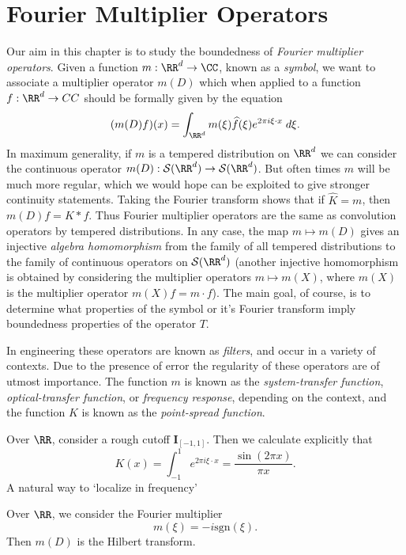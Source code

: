 \chapter{Fourier Multiplier Operators}

Our aim in this chapter is to study the boundedness of \emph{Fourier multiplier operators}. Given a function $m: \RR^d \to \CC$, known as a \emph{symbol}, we want to associate a multiplier operator $m(D)$ which when applied to a function $f: \RR^d \to CC$ should be formally given by the equation
%
\[ (m(D)f)(x) = \int_{\RR^d} m(\xi) \widehat{f}(\xi) e^{2 \pi i \xi \cdot x}\; d\xi. \]
%
In maximum generality, if $m$ is a tempered distribution on $\RR^d$ we can consider the continuous operator $m(D): \mathcal{S}(\RR^d) \to \mathcal{S}(\RR^d)$. But often times $m$ will be much more regular, which we would hope can be exploited to give stronger continuity statements. Taking the Fourier transform shows that if $\widehat{K} = m$, then $m(D) f = K * f$. Thus Fourier multiplier operators are the same as convolution operators by tempered distributions. In any case, the map $m \mapsto m(D)$ gives an injective \emph{algebra homomorphism} from the family of all tempered distributions to the family of continuous operators on $\mathcal{S}(\RR^d)$ (another injective homomorphism is obtained by considering the multiplier operators $m \mapsto m(X)$, where $m(X)$ is the multiplier operator $m(X) f = m \cdot f$). The main goal, of course, is to determine what properties of the symbol or it's Fourier transform imply boundedness properties of the operator $T$.

\begin{remark}
  In engineering these operators are known as \emph{filters}, and occur in a variety of contexts. Due to the presence of error the regularity of these operators are of utmost importance. The function $m$ is known as the \emph{system-transfer function}, \emph{optical-transfer function}, or \emph{frequency response}, depending on the context, and the function $K$ is known as the \emph{point-spread function}.
\end{remark}

\begin{example}
  Over $\RR$, consider a rough cutoff $\mathbf{I}_{[-1,1]}$. Then we calculate explicitly that
  \[ K(x) = \int_{-1}^1 e^{2 \pi i \xi \cdot x} = \frac{\sin(2 \pi x)}{\pi x}. \]
  A natural way to `localize in frequency'
\end{example}

\begin{example}
  Over $\RR$, we consider the Fourier multiplier
  \[ m(\xi) = - i \text{sgn}(\xi). \]
  Then $m(D)$ is the Hilbert transform.
\end{example}

